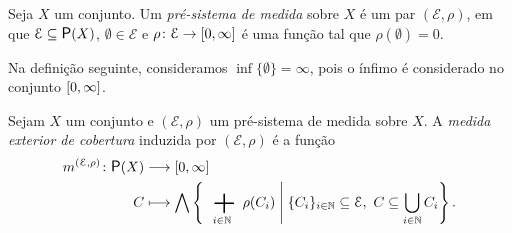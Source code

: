 
\begin{definition}
Seja $X$ um conjunto. Um \emph{pré-sistema de medida} sobre $X$ é um par $(\mathcal E, \rho)$, em que $\mathcal E \subseteq \p(X)$, $\emptyset \in \mathcal E$ e $\rho\colon \mathcal E \to \left[{0},{\infty}\right]$ é uma função tal que $\rho(\emptyset) = 0$.
\end{definition}

Na definição seguinte, consideramos $\inf \{\emptyset\} = \infty$, pois o ínfimo é considerado no conjunto $\left[{0},{\infty}\right]$.

\begin{definition}
Sejam $X$ um conjunto e $(\mathcal E, \rho)$ um pré-sistema de medida sobre $X$. A \emph{medida exterior de cobertura} induzida por $(\mathcal E, \rho)$ é a função
	\begin{align*}
	\func{\med^{(\mathcal E, \rho)}}{\p(X)}{\intff{0}{\infty}}{C}{
		\inf \set{\sum_{i \in \N} \rho(C_i)}{\{C_i\}_{i \in \N} \subseteq \mathcal E,\ C \subseteq \bigcup_{i \in \N} C_i}
	}.
	\end{align*}
\end{definition}

